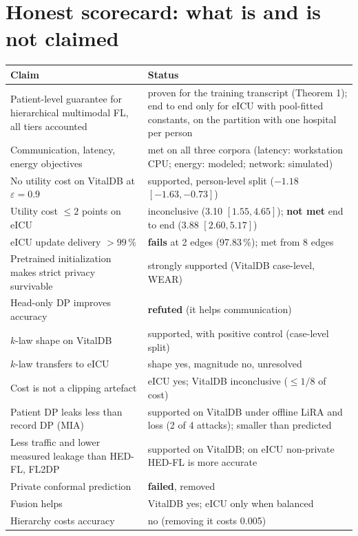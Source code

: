 \documentclass[11pt,a4paper]{article}
\begin{document}
\section{Honest scorecard: what is and is not claimed}

\begin{center}
\small
\begin{tabular}{P{0.5\textwidth} P{0.42\textwidth}}
\toprule
Claim & Status \\
\midrule
Patient-level guarantee for hierarchical multimodal FL, all tiers accounted & proven for the training transcript (Theorem 1); end to end only for eICU with pool-fitted constants, on the partition with one hospital per person \\
Communication, latency, energy objectives & met on all three corpora (latency: workstation CPU; energy: modeled; network: simulated) \\
No utility cost on VitalDB at $\varepsilon = 0.9$ & supported, person-level split ($-1.18$ $[-1.63, -0.73]$) \\
Utility cost $\le 2$ points on eICU & inconclusive (3.10 $[1.55, 4.65]$); \textbf{not met} end to end (3.88 $[2.60, 5.17]$) \\
eICU update delivery $> 99\,\%$ & \textbf{fails} at 2 edges (97.83\,\%); met from 8 edges \\
Pretrained initialization makes strict privacy survivable & strongly supported (VitalDB case-level, WEAR) \\
Head-only DP improves accuracy & \textbf{refuted} (it helps communication) \\
$k$-law shape on VitalDB & supported, with positive control (case-level split) \\
$k$-law transfers to eICU & shape yes, magnitude no, unresolved \\
Cost is not a clipping artefact & eICU yes; VitalDB inconclusive ($\le 1/8$ of cost) \\
Patient DP leaks less than record DP (MIA) & supported on VitalDB under offline LiRA and loss (2 of 4 attacks); smaller than predicted \\
Less traffic and lower measured leakage than HED-FL, FL2DP & supported on VitalDB; on eICU non-private HED-FL is more accurate \\
Private conformal prediction & \textbf{failed}, removed \\
Fusion helps & VitalDB yes; eICU only when balanced \\
Hierarchy costs accuracy & no (removing it costs 0.005) \\
\bottomrule
\end{tabular}
\end{center}
\end{document}
